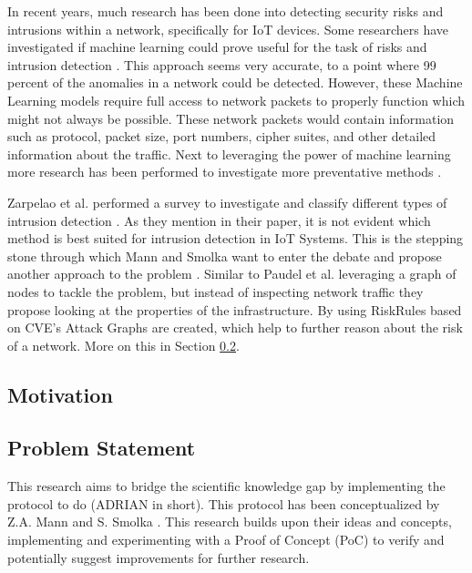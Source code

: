 In recent years, much research has been done into detecting security risks and intrusions within a network, specifically for IoT devices. Some researchers have investigated if machine learning could prove useful for the task of risks and intrusion detection \cite{canedo2016using, doshi2018machine, hamza2019detecting, sivanathan2018classifying}. This approach seems very accurate, to a point where 99 percent of the anomalies in a network could be detected. However, these Machine Learning models require full access to network packets to properly function which might not always be possible. These network packets would contain information such as protocol, packet size, port numbers, cipher suites, and other detailed information about the traffic. Next to leveraging the power of machine learning more research has been performed to investigate more preventative methods \cite{miettinen2017iot, hamza2019detecting, paudel2019detecting}.

Zarpelao et al. performed a survey to investigate and classify different types of intrusion detection \cite{zarpelao2017survey}. As they mention in their paper, it is not evident which method is best suited for intrusion detection in IoT Systems. This is the stepping stone through which Mann and Smolka want to enter the debate and propose another approach to the problem \cite{mann2023ADRIAN}. Similar to Paudel et al. leveraging a graph of nodes to tackle the problem, but instead of inspecting network traffic they propose looking at the properties of the infrastructure. By using RiskRules based on CVE's Attack Graphs are created, which help to further reason about the risk of a network. More on this in Section \ref{ssec:problem-statement}.

\subsection{Motivation}
\label{ssec:motivation}

\subsection{Problem Statement}
\label{ssec:problem-statement}
This research aims to bridge the scientific knowledge gap by implementing the protocol to do \ADRIAN (ADRIAN in short). This protocol has been conceptualized by Z.A. Mann and S. Smolka \cite{mann2023ADRIAN}. This research builds upon their ideas and concepts, implementing and experimenting with a Proof of Concept (PoC) to verify and potentially suggest improvements for further research. 



